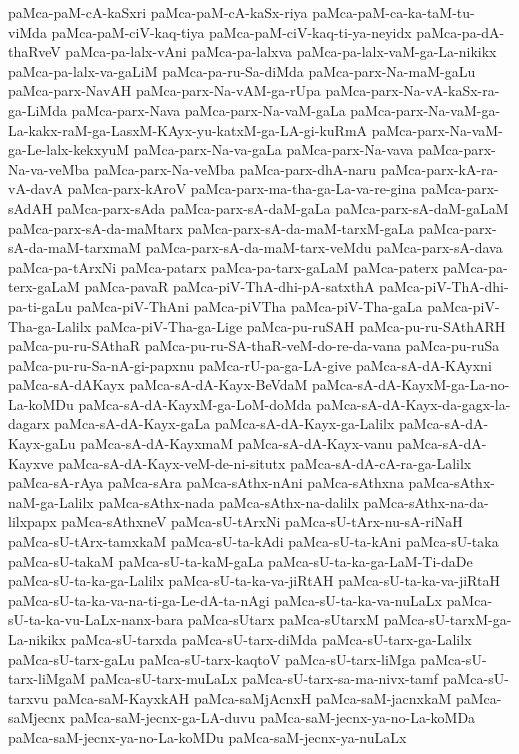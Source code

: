 {paMca-paM-cA-kaSxri
paMca-paM-cA-kaSx-riya
paMca-paM-ca-ka-taM-tu-viMda
paMca-paM-ciV-kaq-tiya
paMca-paM-ciV-kaq-ti-ya-neyidx
paMca-pa-dA-thaRveV
paMca-pa-lalx-vAni
paMca-pa-lalxva
paMca-pa-lalx-vaM-ga-La-nikikx
paMca-pa-lalx-va-gaLiM
paMca-pa-ru-Sa-diMda
paMca-parx-Na-maM-gaLu
paMca-parx-NavAH
paMca-parx-Na-vAM-ga-rUpa
paMca-parx-Na-vA-kaSx-ra-ga-LiMda
paMca-parx-Nava
paMca-parx-Na-vaM-gaLa
paMca-parx-Na-vaM-ga-La-kakx-raM-ga-LasxM-KAyx-yu-katxM-ga-LA-gi-kuRmA
paMca-parx-Na-vaM-ga-Le-lalx-kekxyuM
paMca-parx-Na-va-gaLa
paMca-parx-Na-vava
paMca-parx-Na-va-veMba
paMca-parx-Na-veMba
paMca-parx-dhA-naru
paMca-parx-kA-ra-vA-davA
paMca-parx-kAroV
paMca-parx-ma-tha-ga-La-va-re-gina
paMca-parx-sAdAH
paMca-parx-sAda
paMca-parx-sA-daM-gaLa
paMca-parx-sA-daM-gaLaM
paMca-parx-sA-da-maMtarx
paMca-parx-sA-da-maM-tarxM-gaLa
paMca-parx-sA-da-maM-tarxmaM
paMca-parx-sA-da-maM-tarx-veMdu
paMca-parx-sA-dava
paMca-pa-tArxNi
paMca-patarx
paMca-pa-tarx-gaLaM
paMca-paterx
paMca-pa-terx-gaLaM
paMca-pavaR
paMca-piV-ThA-dhi-pA-satxthA
paMca-piV-ThA-dhi-pa-ti-gaLu
paMca-piV-ThAni
paMca-piVTha
paMca-piV-Tha-gaLa
paMca-piV-Tha-ga-Lalilx
paMca-piV-Tha-ga-Lige
paMca-pu-ruSAH
paMca-pu-ru-SAthARH
paMca-pu-ru-SAthaR
paMca-pu-ru-SA-thaR-veM-do-re-da-vana
paMca-pu-ruSa
paMca-pu-ru-Sa-nA-gi-papxnu
paMca-rU-pa-ga-LA-give
paMca-sA-dA-KAyxni
paMca-sA-dAKayx
paMca-sA-dA-Kayx-BeVdaM
paMca-sA-dA-KayxM-ga-La-no-La-koMDu
paMca-sA-dA-KayxM-ga-LoM-doMda
paMca-sA-dA-Kayx-da-gagx-la-dagarx
paMca-sA-dA-Kayx-gaLa
paMca-sA-dA-Kayx-ga-Lalilx
paMca-sA-dA-Kayx-gaLu
paMca-sA-dA-KayxmaM
paMca-sA-dA-Kayx-vanu
paMca-sA-dA-Kayxve
paMca-sA-dA-Kayx-veM-de-ni-situtx
paMca-sA-dA-cA-ra-ga-Lalilx
paMca-sA-rAya
paMca-sAra
paMca-sAthx-nAni
paMca-sAthxna
paMca-sAthx-naM-ga-Lalilx
paMca-sAthx-nada
paMca-sAthx-na-dalilx
paMca-sAthx-na-da-lilxpapx
paMca-sAthxneV
paMca-sU-tArxNi
paMca-sU-tArx-nu-sA-riNaH
paMca-sU-tArx-tamxkaM
paMca-sU-ta-kAdi
paMca-sU-ta-kAni
paMca-sU-taka
paMca-sU-takaM
paMca-sU-ta-kaM-gaLa
paMca-sU-ta-ka-ga-LaM-Ti-daDe
paMca-sU-ta-ka-ga-Lalilx
paMca-sU-ta-ka-va-jiRtAH
paMca-sU-ta-ka-va-jiRtaH
paMca-sU-ta-ka-va-na-ti-ga-Le-dA-ta-nAgi
paMca-sU-ta-ka-va-nuLaLx
paMca-sU-ta-ka-vu-LaLx-nanx-bara
paMca-sUtarx
paMca-sUtarxM
paMca-sU-tarxM-ga-La-nikikx
paMca-sU-tarxda
paMca-sU-tarx-diMda
paMca-sU-tarx-ga-Lalilx
paMca-sU-tarx-gaLu
paMca-sU-tarx-kaqtoV
paMca-sU-tarx-liMga
paMca-sU-tarx-liMgaM
paMca-sU-tarx-muLaLx
paMca-sU-tarx-sa-ma-nivx-tamf
paMca-sU-tarxvu
paMca-saM-KayxkAH
paMca-saMjAcnxH
paMca-saM-jacnxkaM
paMca-saMjecnx
paMca-saM-jecnx-ga-LA-duvu
paMca-saM-jecnx-ya-no-La-koMDa
paMca-saM-jecnx-ya-no-La-koMDu
paMca-saM-jecnx-ya-nuLaLx
}
